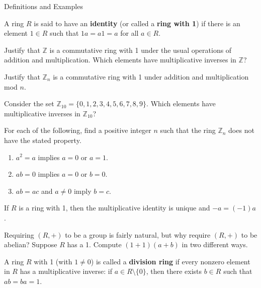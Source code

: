 \begin{section}{Definitions and Examples}
\begin{definition}
A ring $R$ is said to have an \textbf{identity} (or called a \textbf{ring with  1}) if there is an element $1\in R$ such that $1a=a 1=a$ for all $a\in R$.
\end{definition}

\begin{exercise}
Justify that $\mathbb{Z}$ is a commutative ring with 1 under the usual operations of addition and multiplication. Which elements have multiplicative inverses in $\mathbb{Z}$?
\end{exercise}

\begin{exercise}
Justify that $\mathbb{Z}_n$ is a commutative ring with 1 under addition and multiplication mod $n$.
\end{exercise}

\begin{exercise}\label{exer:Z10Ring}
Consider the set $\mathbb{Z}_{10}=\{0,1,2,3,4,5,6,7,8,9\}$. Which elements have multiplicative inverses in $\mathbb{Z}_{10}$?
\end{exercise}

\begin{exercise}
For each of the following, find a positive integer $n$ such that the ring $\mathbb{Z}_n$ does not have the stated property.
\begin{enumerate}[label=\rm{(\alph*)}]
\item $a^2=a$ implies $a=0$ or $a=1$.
\item $ab=0$ implies $a=0$ or $b=0$.
\item $ab=ac$ and $a\neq 0$ imply $b=c$.
\end{enumerate}
\end{exercise}

\begin{theorem}
If $R$ is a ring with 1, then the multiplicative identity is unique and $-a=(-1)a$.
\end{theorem}

\begin{problem}
Requiring $(R,+)$ to be a group is fairly natural, but why require $(R,+)$ to be abelian?  Suppose $R$ has a 1.  Compute $(1+1)(a+b)$ in two different ways.
\end{problem}

\begin{definition}
A ring $R$ with 1 (with $1\neq 0$) is called a \textbf{division ring} if every nonzero element in $R$ has a multiplicative inverse: if $a\in R\setminus\{0\}$, then there exists $b\in R$ such that $ab=ba=1$.
\end{definition}


\end{section}
